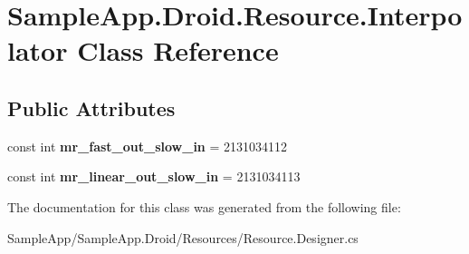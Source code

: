 \hypertarget{class_sample_app_1_1_droid_1_1_resource_1_1_interpolator}{}\section{Sample\+App.\+Droid.\+Resource.\+Interpolator Class Reference}
\label{class_sample_app_1_1_droid_1_1_resource_1_1_interpolator}
\subsection*{Public Attributes}
\begin{DoxyCompactItemize}
\item 
\mbox{\label{class_sample_app_1_1_droid_1_1_resource_1_1_interpolator_afd27a5f7c43fb91e38a2f4b0174e9b1f}} 
const int {\bfseries mr\+\_\+fast\+\_\+out\+\_\+slow\+\_\+in} = 2131034112
\item 
\mbox{\label{class_sample_app_1_1_droid_1_1_resource_1_1_interpolator_a38f6dac44030ae5f18295438c1cfff15}} 
const int {\bfseries mr\+\_\+linear\+\_\+out\+\_\+slow\+\_\+in} = 2131034113
\end{DoxyCompactItemize}


The documentation for this class was generated from the following file\+:\begin{DoxyCompactItemize}
\item 
Sample\+App/\+Sample\+App.\+Droid/\+Resources/Resource.\+Designer.\+cs\end{DoxyCompactItemize}
